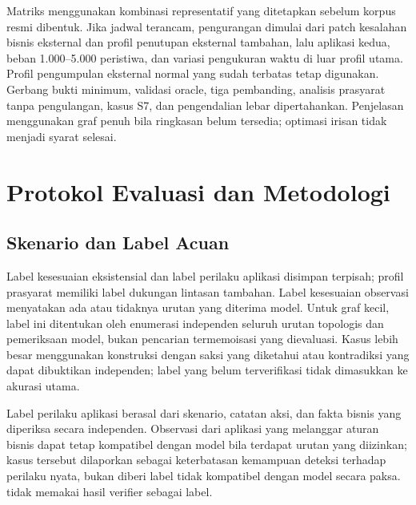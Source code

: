Matriks menggunakan kombinasi representatif yang ditetapkan sebelum korpus resmi dibentuk. Jika jadwal terancam, pengurangan dimulai dari patch kesalahan bisnis eksternal dan profil penutupan eksternal tambahan, lalu aplikasi kedua, beban 1.000--5.000 peristiwa, dan variasi pengukuran waktu di luar profil utama. Profil pengumpulan eksternal normal yang sudah terbatas tetap digunakan. Gerbang bukti minimum, validasi oracle, tiga pembanding, analisis prasyarat tanpa pengulangan, kasus S7, dan pengendalian lebar dipertahankan. Penjelasan menggunakan graf penuh bila ringkasan belum tersedia; optimasi irisan tidak menjadi syarat selesai.

\section{Protokol Evaluasi dan Metodologi}
\subsection{Skenario dan Label Acuan}
\label{sec:scenarios}
Label kesesuaian eksistensial dan label perilaku aplikasi disimpan terpisah; profil prasyarat memiliki label dukungan lintasan tambahan. Label kesesuaian observasi menyatakan ada atau tidaknya urutan yang diterima model. Untuk graf kecil, label ini ditentukan oleh enumerasi independen seluruh urutan topologis dan pemeriksaan model, bukan pencarian termemoisasi yang dievaluasi. Kasus lebih besar menggunakan konstruksi dengan saksi yang diketahui atau kontradiksi yang dapat dibuktikan independen; label yang belum terverifikasi tidak dimasukkan ke akurasi utama.

Label perilaku aplikasi berasal dari skenario, catatan aksi, dan fakta bisnis yang diperiksa secara independen. Observasi dari aplikasi yang melanggar aturan bisnis dapat tetap kompatibel dengan model bila terdapat urutan yang diizinkan; kasus tersebut dilaporkan sebagai keterbatasan kemampuan deteksi terhadap perilaku nyata, bukan diberi label tidak kompatibel dengan model secara paksa.  tidak memakai hasil verifier sebagai label.

